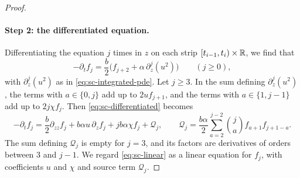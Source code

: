 \begin{proof}
\paragraph{Step 2: the differentiated equation.}
Differentiating the equation $j$ times in $z$ on each strip
$[t_{i-1},t_i)\times\mathbb R$, we find that
\begin{equation}\label{eq:sc-differentiated}
 -\partial_tf_j=\frac b2\bigl(f_{j+2}+\alpha\,\partial_z^j(u^2)\bigr)
 \qquad(j\ge0),
\end{equation}
with $\partial_z^j(u^2)$ as in \eqref{eq:sc-integrated-pde}. Let $j\ge3$. In
the sum defining $\partial_z^j(u^2)$, the terms with $a\in\{0,j\}$ add up to
$2uf_{j+1}$, and the terms with $a\in\{1,j-1\}$ add up to $2j\chi f_j$.
Then \eqref{eq:sc-differentiated} becomes
\begin{equation}\label{eq:sc-linear}
 -\partial_tf_j=\frac b2\partial_{zz}f_j+b\alpha u\,\partial_zf_j
   +jb\alpha\chi f_j+\mathcal Q_j,\qquad
 \mathcal Q_j=\frac{b\alpha}2\sum_{a=2}^{j-2}\binom ja f_{a+1}f_{j+1-a}.
\end{equation}
The sum defining $\mathcal Q_j$ is empty for $j=3$, and its factors are derivatives of
orders between $3$ and $j-1$. We regard \eqref{eq:sc-linear} as a linear
equation for $f_j$, with coefficients $u$ and $\chi$ and source term $\mathcal Q_j$.


\end{proof}
